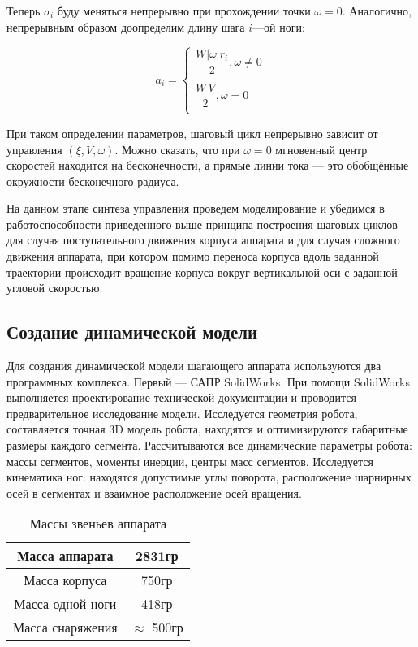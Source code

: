 Теперь $\sigma_i$ буду меняться непрерывно при прохождении точки $\omega=0$. Аналогично, непрерывным образом доопределим длину шага $i$---ой ноги:

\begin{equation}
a_i = \left\{
\begin{array}{lcr}
\dfrac{W|\omega|r_i}{2},\omega\neq0\\
\\
\dfrac{W\,V}{2},\omega=0\\
\end{array}
\right.
\end{equation}
 
При таком определении параметров, шаговый цикл непрерывно зависит от управления  $(\xi,V,\omega)$.
Можно сказать, что при $\omega=0$ мгновенный центр скоростей находится на бесконечности, а прямые линии тока --- это обобщённые окружности бесконечного радиуса.

На данном этапе синтеза управления проведем моделирование и убедимся в работоспособности приведенного выше принципа построения шаговых циклов для случая поступательного движения корпуса аппарата и для случая сложного движения аппарата, при котором помимо переноса корпуса вдоль заданной траектории происходит вращение корпуса вокруг вертикальной оси с заданной угловой скоростью.

\subsection{Создание динамической модели}
Для создания динамической модели шагающего аппарата используются два программных комплекса. Первый --- САПР SolidWorks. При помощи SolidWorks выполняется проектирование технической документации и проводится предварительное исследование модели. Исследуется геометрия робота, составляется точная 3D модель робота, находятся и оптимизируются габаритные размеры каждого сегмента. Рассчитываются все динамические параметры робота: массы сегментов, моменты инерции, центры масс сегментов. Исследуется кинематика ног: находятся допустимые углы поворота, расположение шарнирных осей в сегментах и взаимное расположение осей вращения.
\begin{table}
\begin{center}
	\begin{tabular}{|c|c|}
	\hline
	  Масса аппарата & 2831гр\\
	  \hline
	  Масса корпуса & 750гр\\
	  \hline
	  Масса одной ноги & 418гр \\	  
	  \hline
	  Масса снаряжения & $\approx$ 500гр\\
	  \hline
	  \end{tabular}
	  \label{tab:masses}
\end{center}
\caption{Массы звеньев аппарата}
\end{table}

